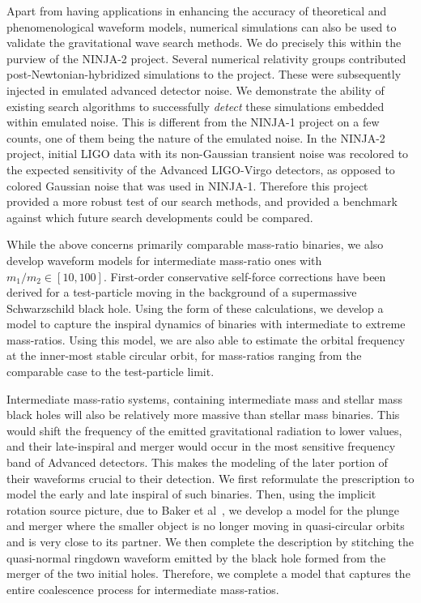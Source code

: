Apart from having applications in enhancing the accuracy of theoretical 
and phenomenological waveform models, numerical simulations can also be used
to validate the gravitational wave search methods. We do precisely this within
the purview of the NINJA-2 project. Several numerical relativity groups contributed
post-Newtonian-hybridized simulations to the project. These were subsequently
injected in emulated advanced detector noise. We demonstrate the ability of
existing search algorithms to successfully {\it detect} these simulations
embedded within emulated noise. This is different from the NINJA-1 project
on a few counts, one of them being the nature of the emulated noise. In the 
NINJA-2 project, initial LIGO data with its non-Gaussian transient noise was
recolored to the expected sensitivity of the Advanced LIGO-Virgo detectors, as
opposed to colored Gaussian noise that was used in NINJA-1. 
Therefore this project provided a more robust test of our search methods, and 
provided a benchmark against which future search developments could be compared.


While the above concerns primarily comparable mass-ratio binaries, we 
also develop waveform models for intermediate mass-ratio ones with 
$m_1/m_2 \in [10, 100]$. First-order conservative self-force corrections 
have been derived for a test-particle moving in the background of a 
supermassive Schwarzschild black hole. Using the form of these calculations,
we develop a model to capture the inspiral dynamics of binaries with 
intermediate to extreme mass-ratios. Using this model, we are also able to 
estimate the orbital frequency at the inner-most stable circular orbit, 
for mass-ratios ranging from the comparable case to the test-particle limit.

Intermediate mass-ratio systems, containing intermediate mass and stellar
mass black holes will also be relatively more massive than stellar mass binaries.
This would shift the frequency of the emitted gravitational radiation to 
lower values, and their late-inspiral and merger would occur in the most
sensitive frequency band of Advanced detectors. This makes the modeling 
of the later portion of their waveforms crucial to their detection. 
We first reformulate the prescription to model the early and late inspiral
of such binaries. Then, using the implicit rotation source picture,
due to Baker et al~\cite{}, we develop a model for the plunge and merger
where the smaller object is no longer moving in quasi-circular orbits
and is very close to its partner. We then complete the description 
by stitching the quasi-normal ringdown waveform emitted by the black hole formed from 
the merger of the two initial holes. Therefore, we complete a model that
captures the entire coalescence process for intermediate mass-ratios.

